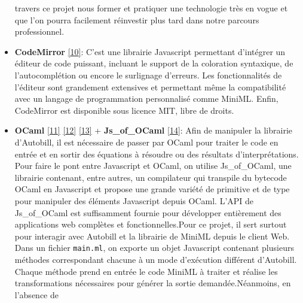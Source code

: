 \documentclass[12pt]{article}
\begin{document}
\begin{itemize}
                  travers ce projet nous former et pratiquer une technologie très en
                  vogue et que l'on pourra facilement réinvestir plus tard dans notre
                  parcours professionnel.
            \item
                  \textbf{CodeMirror} \protect\hyperlink{ref-codemirror}{{[}10{]}}:
                  C'est une librairie Javascript permettant d'intégrer un éditeur de
                  code puissant, incluant le support de la coloration syntaxique, de
                  l'autocomplétion ou encore le surlignage d'erreurs. Les
                  fonctionnalités de l'éditeur sont grandement extensives et permettant
                  même la compatibilité avec un langage de programmation personnalisé
                  comme MiniML. Enfin, CodeMirror est disponible sous licence MIT, libre
                  de droits.
            \item
                  \textbf{OCaml} \protect\hyperlink{ref-Minsky_Ocaml}{{[}11{]}}
                  \protect\hyperlink{ref-chailloux}{{[}12{]}}
                  \protect\hyperlink{ref-Leroy}{{[}13{]}} + \textbf{Js\_of\_OCaml}
                  \protect\hyperlink{ref-js_of_ocaml}{{[}14{]}}: Afin de manipuler la
                  librairie d'Autobill, il est nécessaire de passer par OCaml pour
                  traiter le code en entrée et en sortir des équations à résoudre ou des
                  résultats d'interprétations. Pour faire le pont entre Javascript et
                  OCaml, on utilise Js\_of\_OCaml, une librairie contenant, entre
                  autres, un compilateur qui transpile du bytecode OCaml en Javascript
                  et propose une grande variété de primitive et de type pour manipuler
                  des éléments Javascript depuis OCaml. L'API de Js\_of\_OCaml est
                  suffisamment fournie pour développer entièrement des applications web
                  complètes et fonctionnelles.\newline  Pour ce projet, il sert surtout
                  pour interagir avec Autobill et la librairie de MiniML depuis le
                  client Web. Dans un fichier \texttt{main.ml}, on exporte un objet
                  Javascript contenant plusieurs méthodes correspondant chacune à un
                  mode d'exécution différent d'Autobill. Chaque méthode prend en entrée
                  le code MiniML à traiter et réalise les transformations nécessaires
                  pour générer la sortie demandée.\newline  Néanmoins, en l'absence de

\end{itemize}
\end{document}

